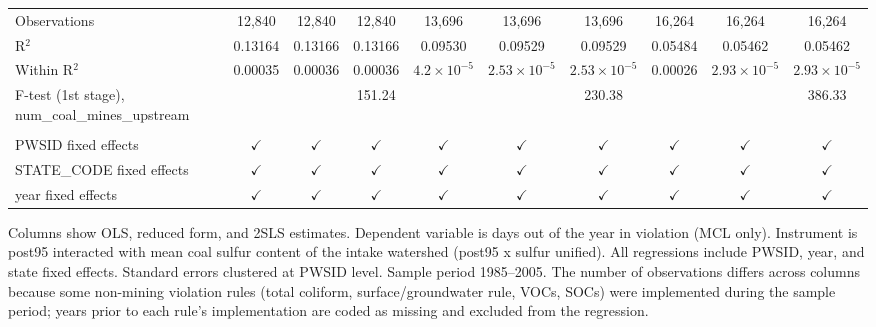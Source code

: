 \begin{table}[htbp]
\begin{adjustbox}{width = \textwidth, center}
\begin{tabular}{lccccccccc}
         Observations                                      & 12,840        & 12,840        & 12,840        & 13,696               & 13,696                & 13,696                & 16,264        & 16,264                & 16,264\\  
         R$^2$                                             & 0.13164       & 0.13166       & 0.13166       & 0.09530              & 0.09529               & 0.09529               & 0.05484       & 0.05462               & 0.05462\\  
         Within R$^2$                                      & 0.00035       & 0.00036       & 0.00036       & $4.2\times 10^{-5}$  & $2.53\times 10^{-5}$  & $2.53\times 10^{-5}$  & 0.00026       & $2.93\times 10^{-5}$  & $2.93\times 10^{-5}$\\   
         F-test (1st stage), num\_coal\_mines\_upstream    &               &               & 151.24        &                      &                       & 230.38                &               &                       & 386.33\\  
         
          \\
         
         PWSID fixed effects                               & $\checkmark$  & $\checkmark$  & $\checkmark$  & $\checkmark$         & $\checkmark$          & $\checkmark$          & $\checkmark$  & $\checkmark$          & $\checkmark$\\   
         STATE\_CODE fixed effects                         & $\checkmark$  & $\checkmark$  & $\checkmark$  & $\checkmark$         & $\checkmark$          & $\checkmark$          & $\checkmark$  & $\checkmark$          & $\checkmark$\\   
         year fixed effects                                & $\checkmark$  & $\checkmark$  & $\checkmark$  & $\checkmark$         & $\checkmark$          & $\checkmark$          & $\checkmark$  & $\checkmark$          & $\checkmark$\\   
         
         \bottomrule
         
      \end{tabular}
      
      
      
   \end{adjustbox}
      {\tiny\linespread{1}\selectfont \par \raggedright 
   Columns show OLS, reduced form, and 2SLS estimates. Dependent variable is days out of the year in violation (MCL only). Instrument is post95 interacted with mean coal sulfur content of the intake watershed (post95 x sulfur unified). All regressions include PWSID, year, and state fixed effects. Standard errors clustered at PWSID level. Sample period 1985--2005. The number of observations differs across columns because some non-mining violation rules (total coliform, surface/groundwater rule, VOCs, SOCs) were implemented during the sample period; years prior to each rule's implementation are coded as missing and excluded from the regression.}
   
\end{table}


